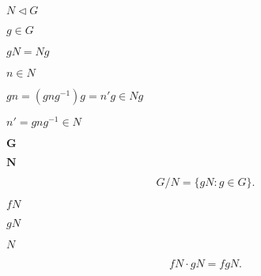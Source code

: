 \documentclass[10pt]{book}
\begin{document}
\begin{mdSnippets}
\begin{mdInlineSnippet}[c00ea0a228d6a82d969db72a24b3b6f7]
$N \triangleleft G$\end{mdInlineSnippet}%
\begin{mdInlineSnippet}[c9742018c5575f06f59ce542b29ad79d]%
$g \in G$\end{mdInlineSnippet}%
\begin{mdInlineSnippet}[7678fb93e815f0521d151d1fc5a6a3f4]%
$gN = Ng$\end{mdInlineSnippet}%
\begin{mdInlineSnippet}[eb9d2cf8e2fbcedbbfd139cc562e1655]%
$n \in N$\end{mdInlineSnippet}%
\begin{mdInlineSnippet}[7f7e77c0b7761de0ff2c3109ecea62ac]%
$gn = (gng^{-1})g = n'g \in Ng$\end{mdInlineSnippet}%
\begin{mdInlineSnippet}%
$n' = gng^{-1} \in N$\end{mdInlineSnippet}%
\begin{mdInlineSnippet}%
$\bm{G}$\end{mdInlineSnippet}%
\begin{mdInlineSnippet}%
$\bm{N}$\end{mdInlineSnippet}%
\begin{mdDisplaySnippet}[ec3772a1437c8241d1c9107f9bdf295d]%
\[%
G/N = \{gN : g \in G\}.
\]%
\end{mdDisplaySnippet}%
\begin{mdInlineSnippet}%
$fN$\end{mdInlineSnippet}%
\begin{mdInlineSnippet}[92b153d4883517e244d6bd3f4ef1f9c7]%
$gN$\end{mdInlineSnippet}%
\begin{mdInlineSnippet}[8d9c307cb7f3c4a32822a51922d1ceaa]%
$N$\end{mdInlineSnippet}%
\begin{mdDisplaySnippet}%
\[%
fN \cdot gN = fgN.
\]%
\end{mdDisplaySnippet}%
\begin{mdInlineSnippet}[aa264a8ce114f1e86dda79b1f6205717]%

\end{mdInlineSnippet}
\end{mdSnippets}
\end{document}
